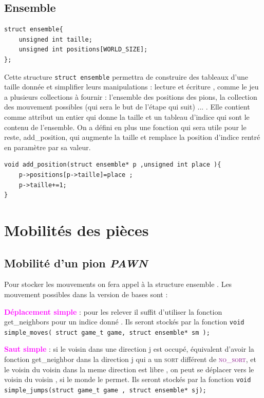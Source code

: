 \documentclass[a4paper]{article}
\begin{document}
\subsection{Ensemble}
\begin{lstlisting}
struct ensemble{
    unsigned int taille;
    unsigned int positions[WORLD_SIZE];
};
\end{lstlisting}
Cette structure \lstinline|struct ensemble|  permettra de construire des tableaux d’une taille donnée et simplifier leurs 
manipulations : lecture et écriture , comme le jeu a plusieurs collections à fournir : l’ensemble des positions des pions, la 
collection des mouvement possibles (qui sera le but de l’étape qui suit) ... . Elle contient comme attribut un entier qui donne la 
taille et un tableau d'indice qui sont le contenu de l'ensemble.
On a défini en plus une fonction qui sera utile pour le reste, add\_position, qui augmente la taille et remplace la position d’indice 
rentré en paramètre par sa valeur. 
\begin{lstlisting}
void add_position(struct ensemble* p ,unsigned int place ){
    p->positions[p->taille]=place ;
    p->taille+=1;
}
\end{lstlisting}
\section{Mobilités des pièces}
\subsection{Mobilité d'un pion \textit{PAWN}}
Pour stocker les mouvements on fera appel à la structure ensemble . Les mouvement possibles dans la version de bases sont :  

    \textbf{\textcolor{magenta}{Déplacement simple}} : pour les relever il suffit d’utiliser la fonction get\_neighbors pour un indice donné . Ils seront stockés par la fonction \lstinline|void simple_moves( struct game_t game, struct ensemble* sm );|

    \textbf{\textcolor{magenta}{Saut simple}} : si le voisin dans une direction j est occupé, équivalent d’avoir la fonction get\_neighbor dans la direction j qui a un \textsc{sort} différent de \textcolor{purple}{\textsc{no\_sort}}, et le voisin du voisin dans la meme direction est libre ,  on peut se déplacer vers le voisin du voisin , si le monde le permet. Ils seront stockés par la fonction \lstinline|void simple_jumps(struct game_t game , struct ensemble* sj);|
    
\end{document}
